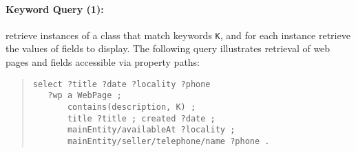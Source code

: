 \paragraph{Keyword Query (1):} retrieve instances of a class that match keywords \verb|K|, and for each instance retrieve the values of fields to display.
The following query illustrates retrieval of web pages and fields accessible via property paths:
\begin{quote}
{\footnotesize
\begin{verbatim}
select ?title ?date ?locality ?phone
   ?wp a WebPage ; 
       contains(description, K) ;   
       title ?title ; created ?date ;
       mainEntity/availableAt ?locality ;
       mainEntity/seller/telephone/name ?phone .
\end{verbatim}}
\end{quote}
